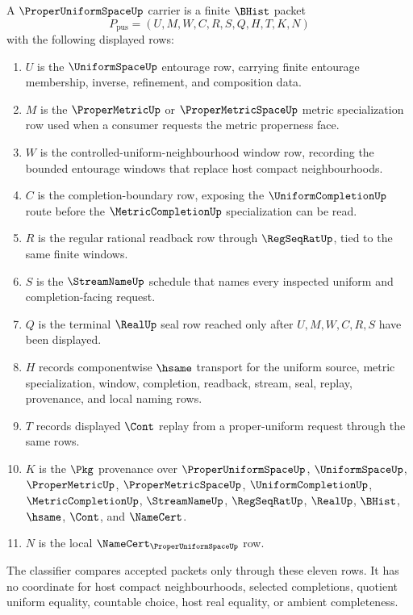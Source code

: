 \begin{definition}
\label{def:proper-uniform-space-carrier}
A $\ProperUniformSpaceUp$ carrier is a finite $\BHist$ packet
$$
P_{\mathrm{pus}}=(U,M,W,C,R,S,Q,H,T,K,N)
$$
with the following displayed rows:
\begin{enumerate}
\item $U$ is the $\UniformSpaceUp$ entourage row, carrying finite entourage membership, inverse, refinement, and composition data.
\item $M$ is the $\ProperMetricUp$ or $\ProperMetricSpaceUp$ metric specialization row used when a consumer requests the metric properness face.
\item $W$ is the controlled-uniform-neighbourhood window row, recording the bounded entourage windows that replace host compact neighbourhoods.
\item $C$ is the completion-boundary row, exposing the $\UniformCompletionUp$ route before the $\MetricCompletionUp$ specialization can be read.
\item $R$ is the regular rational readback row through $\RegSeqRatUp$, tied to the same finite windows.
\item $S$ is the $\StreamNameUp$ schedule that names every inspected uniform and completion-facing request.
\item $Q$ is the terminal $\RealUp$ seal row reached only after $U,M,W,C,R,S$ have been displayed.
\item $H$ records componentwise $\hsame$ transport for the uniform source, metric specialization, window, completion, readback, stream, seal, replay, provenance, and local naming rows.
\item $T$ records displayed $\Cont$ replay from a proper-uniform request through the same rows.
\item $K$ is the $\Pkg$ provenance over $\ProperUniformSpaceUp$, $\UniformSpaceUp$, $\ProperMetricUp$, $\ProperMetricSpaceUp$, $\UniformCompletionUp$, $\MetricCompletionUp$, $\StreamNameUp$, $\RegSeqRatUp$, $\RealUp$, $\BHist$, $\hsame$, $\Cont$, and $\NameCert$.
\item $N$ is the local $\NameCert_{\ProperUniformSpaceUp}$ row.
\end{enumerate}
The classifier compares accepted packets only through these eleven rows. It has no coordinate for host compact neighbourhoods, selected completions, quotient uniform equality, countable choice, host real equality, or ambient completeness.
\end{definition}

